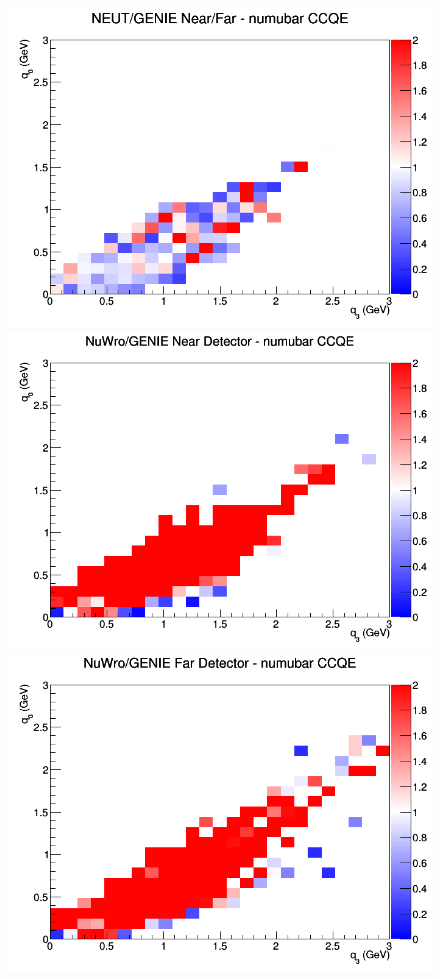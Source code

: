 \begin{figure}[h]
\endminipage
{}
\includegraphics[width=\linewidth]{eff_q0_q3/GAr/ratios/CCQE_NEUT_GENIE_numubar_NF_q3_q0.png}
\endminipage
\newline
{}
\includegraphics[width=\linewidth]{eff_q0_q3/GAr/ratios/CCQE_NuWro_GENIE_numubar_near_q3_q0.png}
\endminipage
{}
\includegraphics[width=\linewidth]{eff_q0_q3/GAr/ratios/CCQE_NuWro_GENIE_numubar_far_q3_q0.png}

\end{figure}
